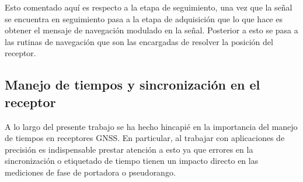 \documentclass[a4paper,12pt,oneside,onecolumn,final,openright]{book}%
\begin{document}
	Esto comentado aquí es respecto a la etapa de seguimiento, una vez que la señal se encuentra en seguimiento pasa a la etapa de adquisición que lo que hace es obtener el mensaje de navegación modulado en la señal. Posterior a esto se pasa a las rutinas de navegación que son las encargadas de resolver la posición del receptor.
\subsection{Manejo de tiempos y sincronización en el receptor}\label{sec:times}
	A lo largo del presente trabajo se ha hecho hincapié en la importancia del manejo de tiempos en receptores GNSS. En particular, al trabajar con aplicaciones de precisión es indispensable prestar atención a esto ya que errores en la sincronización o etiquetado de tiempo tienen un impacto directo en las mediciones de fase de portadora o pseudorango. 
	
\end{document}
